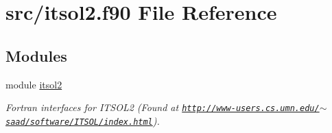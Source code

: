 \hypertarget{itsol2_8f90}{}\section{src/itsol2.f90 File Reference}
\label{itsol2_8f90}
\subsection*{Modules}
\begin{DoxyCompactItemize}
\item 
module \hyperlink{namespaceitsol2}{itsol2}
\begin{DoxyCompactList}\small\item\em Fortran interfaces for I\+T\+S\+O\+L2 (Found at \href{http://www-users.cs.umn.edu/~saad/software/ITSOL/index.html}{\tt http\+://www-\/users.\+cs.\+umn.\+edu/$\sim$saad/software/\+I\+T\+S\+O\+L/index.\+html}). \end{DoxyCompactList}\end{DoxyCompactItemize}
